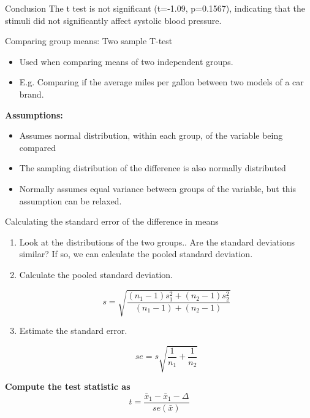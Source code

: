\documentclass[xcolor=dvipsnames]{beamer}
\begin{document}
\begin{frame}{Conclusion}
The t test is not significant (t=-1.09, p=0.1567), indicating that the stimuli did not significantly affect systolic blood pressure.

\end{frame}

\begin{frame}{Comparing group means: Two sample T-test}
\begin{itemize}
\item Used when comparing means of two independent groups.
\item E.g. Comparing if the average miles per gallon between two models of a car brand.
\end{itemize}
\textbf{Assumptions:}\\
\begin{itemize}
\item Assumes normal distribution, within each group, of the variable being compared 

\item The sampling distribution of the difference is also normally distributed

\item Normally assumes equal variance between groups of the variable, but this assumption can be relaxed.

\end{itemize}
\end{frame}

\begin{frame}{Calculating the standard error of the difference in means
}
\begin{enumerate}
\item Look at the distributions of the two groups..  Are the standard deviations similar?
If so, we can calculate the pooled standard deviation.

\item Calculate the pooled standard deviation.

\begin{equation*}
s=\sqrt{\frac{(n_1-1)s_1^2+(n_2-1)s_2^2}{(n_1-1)+(n_2-1)}}
\end{equation*}

\item Estimate the standard error.

\begin{equation*}
se=s\sqrt{\frac{1}{n_1}+\frac{1}{n_2}}
\end{equation*}

\end{enumerate}

\end{frame}

\begin{frame}
\textbf{Compute the test statistic as}
\begin{equation*}
t=\frac{\bar{x}_1-\bar{x}_1-\Delta}{se(\bar{x})}
\end{equation*}

\end{frame}
\end{document}
